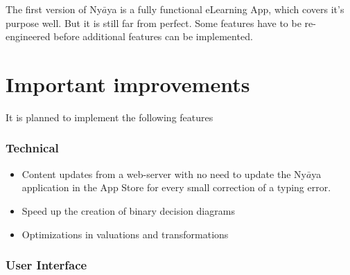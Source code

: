 
The first version of Ny$\bar{a}$ya is a fully functional eLearning App, 
which covers it’s purpose well.
But it is still far from perfect.
Some features have to be re-engineered before additional features can be implemented.

\section{Important improvements}

It is planned to implement the following features 

\subsubsection{Technical}

\begin{itemize}

\item Content updates from a web-server 
with no need to update the Ny$\bar{a}$ya application in the App Store 
for every small correction of a typing error. 

\item Speed up the creation of binary decision diagrams

\item Optimizations in valuations and transformations

\end{itemize}

\subsubsection{User Interface}

